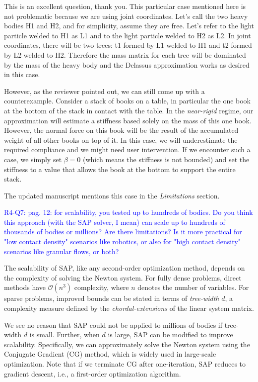 This is an excellent question, thank you. This particular case mentioned here is
not problematic because we are using joint coordinates. Let's call the two heavy
bodies H1 and H2, and for simplicity, assume they are free. Let's refer to the
light particle welded to H1 as L1 and to the light particle welded to H2 as L2.
In joint coordinates, there will be two trees: t1 formed by L1 welded to H1 and
t2 formed by L2 welded to H2. Therefore the mass matrix for each tree will be
dominated by the mass of the heavy body and the Delassus approximation works
as desired in this case.

However, as the reviewer pointed out, we can still come up with a
counterexample. Consider a stack of books on a table, in particular the one book
at the bottom of the stack in contact with the table. In the \emph{near-rigid}
regime, our approximation will estimate a stiffness based solely on the mass of
this one book. However, the normal force on this book will be the result of the
accumulated weight of all other books on top of it. In this case, we will
underestimate the required compliance and we might need user intervention. 
If we encounter such a case, we simply set $\beta=0$ (which means
the stiffness is not bounded) and set the stiffness to a value that allows the
book at the bottom to support the entire stack.

The updated manuscript mentions this case in the \emph{Limitations} section.

\vspace{5mm}
\textcolor{blue}{R4-Q7: pag. 12: for scalability, you tested up to hundreds of
bodies. Do you think this approach (with the SAP solver, I mean) can scale up to
hundreds of thousands of bodies or millions? Are there limitations? Is it more
practical for "low contact density" scenarios like robotics, or also for "high
contact density" scenarios like granular flows, or both?}

The scalability of SAP, like any second-order optimization method, depends on
the complexity of solving the Newton system. For fully dense problems,
direct methods have $\mathcal{O}(n^3)$ complexity, where $n$
denotes the number of variables.  For sparse problems, improved bounds can be
stated in terms of \emph{tree-width} $d$, a complexity measure defined by the
\emph{chordal-extensions} of the linear system matrix.

We see no reason that SAP could not be applied to millions of bodies if
tree-width $d$ is small.  Further, when $d$ is large, SAP can be modified to improve
scalability.  Specifically, we can approximately solve the Newton system using
the Conjugate Gradient (CG) method, which is widely used in large-scale
optimization.  Note that if we terminate CG after one-iteration, SAP reduces to
gradient descent, i.e., a first-order optimization algorithm. 

